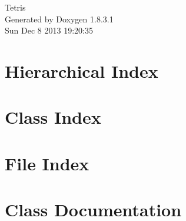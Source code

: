 \documentclass{book}
\begin{document}
\hypersetup{pageanchor=false,citecolor=blue}
\begin{titlepage}
\vspace*{7cm}
\begin{center}
{\Large Tetris }\\
\vspace*{1cm}
{\large Generated by Doxygen 1.8.3.1}\\
\vspace*{0.5cm}
{\small Sun Dec 8 2013 19:20:35}\\
\end{center}
\end{titlepage}
\clearemptydoublepage
{}
\tableofcontents
\clearemptydoublepage
{}
\hypersetup{pageanchor=true,citecolor=blue}
\chapter{Hierarchical Index}

\chapter{Class Index}

\chapter{File Index}

\chapter{Class Documentation}

















































\end{document}
